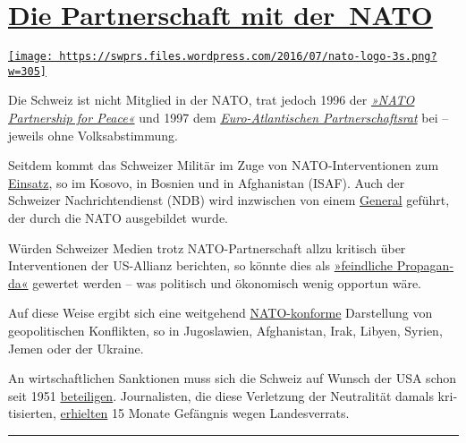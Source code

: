 \hypertarget{die-partnerschaft-mit-der-nato}{%
\section{\texorpdfstring{\href{https://swprs.org/2017/03/01/schweizer-medien-nato/}{Die
Partnerschaft mit
der~NATO}}{Die Partnerschaft mit der~NATO}}\label{die-partnerschaft-mit-der-nato}}

\href{https://swprs.org/2017/03/01/schweizer-medien-nato/}{\texttt{[image: https://swprs.files.wordpress.com/2016/07/nato-logo-3s.png?w=305]}}

Die Schweiz ist nicht Mit­glied in der NATO, trat jedoch 1996 der
\emph{\href{http://www.pfp.admin.ch/}{»NATO Partner­ship for Peace«}}
und 1997 dem
\emph{\href{http://www.nato.int/docu/review/2007/issue2/german/art5.html}{Euro-Atlan­tischen
Par­tner­schafts­rat}} bei -- je­weils ohne Volks­ab­stimmung.

Seit­dem kommt das Schweizer Militär im Zuge von NATO-Inter­­ven­­tionen
zum \href{https://www.peace-support.ch/de/}{Einsatz}, so im Kosovo, in
Bosnien und in Afgha­ni­stan (ISAF). Auch der Schweizer
Nach­richten­dienst (NDB) wird inzwischen von einem
\href{https://www.admin.ch/gov/de/start/dokumentation/medienmitteilungen.msg-id-70400.html}{General}
geführt, der durch die NATO ausgebildet wurde.

Würden Schweizer Medien trotz NATO-Part­ner­schaft allzu kritisch über
Interventionen der US-Allianz berichten, so könnte dies als
\href{https://swprs.org/russische-propaganda/}{»feind­li­che
Pro­pa­gan­da«} ge­wer­tet werden -- was po­li­tisch und ökonomisch
wenig opportun wäre.

Auf diese Weise ergibt sich eine weitgehend
\href{https://swprs.org/medien-navigator/}{NATO-kon­forme} Darstellung
von geopolitischen Kon­flik­ten, so in Jugoslawien, Afgha­ni­stan, Irak,
Li­by­en, Syrien, Jemen oder der Ukraine.

An wirtschaftlichen Sanktionen muss sich die Schweiz auf Wunsch der USA
schon seit 1951
\href{https://de.wikipedia.org/wiki/Hotz-Linder-Agreement}{be­tei­li­gen}.
Jour­na­listen, die diese Ver­letzung der Neu­tra­lität damals
kri­ti­sierten,
\href{https://web.archive.org/web/20141206061445/http://buchundnetz.com/online-buch/schnueffelstaat-schweiz-ob/iii-modernisieren-oder-abschaffen/staatsschutz-je-nach-wetterlage/}{er­hielten}
15 Mo­nate Gefäng­nis wegen Landes­verrats.

\begin{center}\rule{0.5\linewidth}{\linethickness}\end{center}

